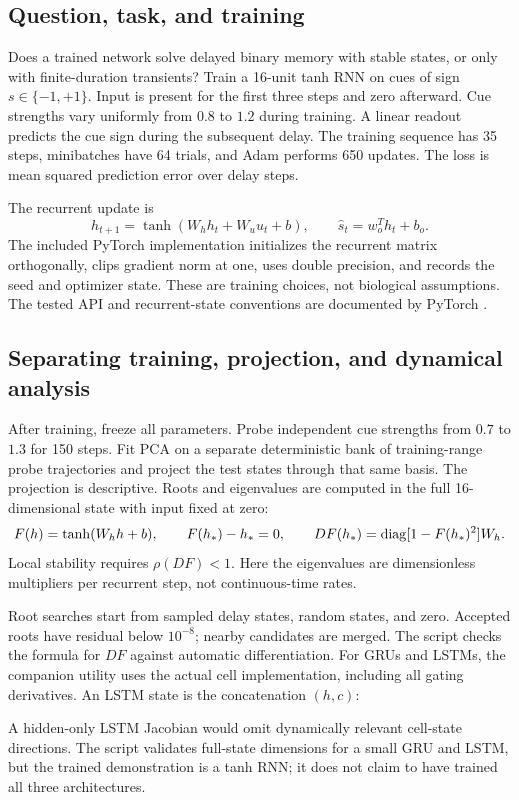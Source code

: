 \subsection{Question, task, and training}
Does a trained network solve delayed binary memory with stable states, or only with finite-duration transients? Train a 16-unit tanh RNN on cues of sign $s\in\{-1,+1\}$. Input is present for the first three steps and zero afterward. Cue strengths vary uniformly from $0.8$ to $1.2$ during training. A linear readout predicts the cue sign during the subsequent delay. The training sequence has 35 steps, minibatches have 64 trials, and Adam performs 650 updates. The loss is mean squared prediction error over delay steps.

The recurrent update is
\begin{equation}
h_{t+1}=\tanh(W_hh_t+W_uu_t+b),\qquad
\widehat s_t=w_o^Th_t+b_o.
\end{equation}
The included PyTorch implementation initializes the recurrent matrix orthogonally, clips gradient norm at one, uses double precision, and records the seed and optimizer state. These are training choices, not biological assumptions. The tested API and recurrent-state conventions are documented by PyTorch \citep{root_torch_rnn,app_torchlstm}.

\subsection{Separating training, projection, and dynamical analysis}
After training, freeze all parameters. Probe independent cue strengths from $0.7$ to $1.3$ for 150 steps. Fit PCA on a separate deterministic bank of training-range probe trajectories and project the test states through that same basis. The projection is descriptive. Roots and eigenvalues are computed in the full 16-dimensional state with input fixed at zero:
\begin{equation}
F(h)=\tanh(W_hh+b),\qquad
F(h_*)-h_*=0,\qquad
DF(h_*)=\operatorname{diag}[1-F(h_*)^2]W_h.
\end{equation}
Local stability requires $\rho(DF)<1$. Here the eigenvalues are dimensionless multipliers per recurrent step, not continuous-time rates.

Root searches start from sampled delay states, random states, and zero. Accepted roots have residual below $10^{-8}$; nearby candidates are merged. The script checks the formula for $DF$ against automatic differentiation. For GRUs and LSTMs, the companion utility uses the actual cell implementation, including all gating derivatives. An LSTM state is the concatenation $(h,c)$:

A hidden-only LSTM Jacobian would omit dynamically relevant cell-state directions. The script validates full-state dimensions for a small GRU and LSTM, but the trained demonstration is a tanh RNN; it does not claim to have trained all three architectures.

